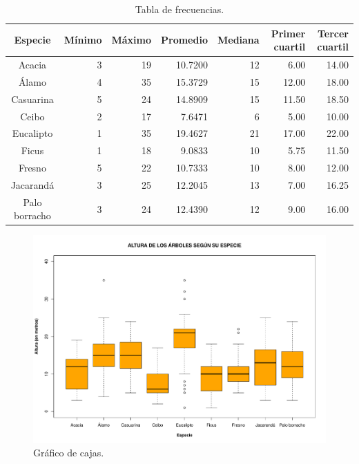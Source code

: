 \documentclass[11pt]{article}
\begin{document}
\begin{table}[h!]
  \begin{center}
    \begin{tabular}{| c | r | r | r | r | r | r |}
      \hline
      \textbf{Especie} & \textbf{Mínimo} & \textbf{Máximo} & \textbf{Promedio} &
      \textbf{Mediana} & \textbf{Primer cuartil} & \textbf{Tercer cuartil}  \\ \hline
      Acacia & 3 & 19 & 10.7200 & 12 & 6.00 & 14.00 \\ \hline
	    Álamo & 4 & 35 & 15.3729 & 15 & 12.00 & 18.00 \\ \hline
	    Casuarina & 5 & 24 & 14.8909 & 15 & 11.50 & 18.50 \\ \hline
	    Ceibo & 2 & 17 & 7.6471 & 6 & 5.00 & 10.00 \\ \hline
	    Eucalipto & 1 & 35 & 19.4627 & 21 & 17.00 & 22.00 \\ \hline
	    Ficus & 1 & 18 & 9.0833 & 10 & 5.75 & 11.50 \\ \hline
	    Fresno & 5 & 22 & 10.7333 & 10 & 8.00 & 12.00 \\ \hline
	    Jacarandá & 3 & 25 & 12.2045 & 13 & 7.00 & 16.25 \\ \hline
	    Palo borracho & 3 & 24 & 12.4390 & 12 & 9.00 & 16.00 \\ \hline
    \end{tabular}
    \caption{Tabla de frecuencias.}
    \label{tab:tablaAlturaEspecie}
  \end{center}
\end{table}

\begin{figure}[h!]
  \begin{center}
    \includegraphics[width=0.9\linewidth]{boxAlturaEspecie.pdf}
    \caption{Gráfico de cajas.}
    \label{fig:boxAlturaEspecie}
  \end{center}  
\end{figure}
\end{document}
